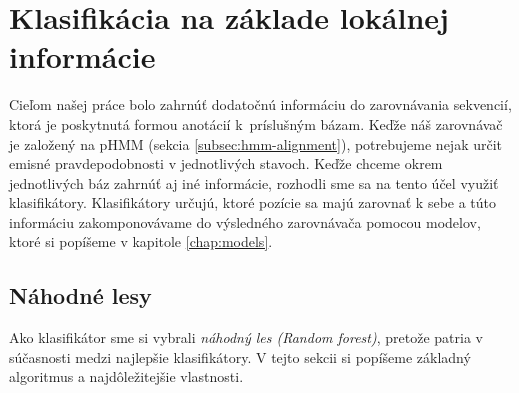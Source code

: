 \chapter[Klasifikácia]{Klasifikácia na základe lokálnej informácie}

Cieľom našej práce bolo zahrnúť dodatočnú informáciu do zarovnávania sekvencií, ktorá je poskytnutá formou anotácií k~príslušným bázam. Keďže náš zarovnávač je založený na pHMM (sekcia \ref{subsec:hmm-alignment}), potrebujeme nejak určit emisné pravdepodobnosti v jednotlivých stavoch. Keďže chceme okrem jednotlivých báz zahrnúť aj iné informácie, rozhodli sme sa na tento účel využiť klasifikátory. Klasifikátory určujú, ktoré pozície sa majú zarovnať k sebe a túto informáciu zakomponovávame do výsledného zarovnávača pomocou modelov, ktoré si popíšeme v kapitole \ref{chap:models}.

\section{Náhodné lesy}



Ako klasifikátor sme si vybrali \textit{náhodný les (Random forest)}, pretože patria v súčasnosti medzi najlepšie klasifikátory. V tejto sekcii si popíšeme základný algoritmus a najdôležitejšie vlastnosti.

